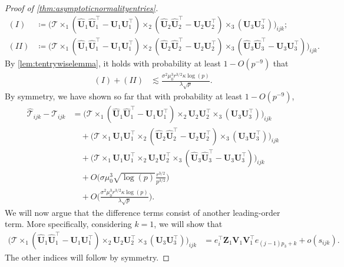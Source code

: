 \documentclass[10pt]{article}
\newcommand{\0}{{\mathbf{0}}}
\newcommand{\1}{{\mathbf{1}}}
\newcommand{\U}{{\mathbf{U}}}
\renewcommand{\t}{^{\top}}
\newcommand{\uhat}{\mathbf{\hat{U}}}
\renewcommand{\hat}{\widehat}
\renewcommand{\hat}{\widehat}
\begin{document}
\begin{proof}[Proof of \cref{thm:asymptoticnormalityentries}]
\begin{align*}
    (I) &\coloneqq  \bigg( \mathcal{T} \times_1 (\uhat_1 \uhat_1\t - \U_1\U_1\t) \times_2 ( \uhat_2 \uhat_2\t - \U_2 \U_2\t) \times_3 (\U_3 \U_3\t) \bigg)_{ijk}; \\
    (II) &\coloneqq \bigg( \mathcal{T} \times_1 (\uhat_1 \uhat_1\t - \U_1\U_1\t) \times_2 ( \uhat_2 \uhat_2\t - \U_2 \U_2\t) \times_3 (\uhat_3 \uhat_3\t - \U_3 \U_3\t) \bigg)_{ijk}.
\end{align*}
By \cref{lem:tentrywiselemma}, it holds with probability at least $1 - O(p^{-9})$ that
\begin{align*}
    (I) + (II) &\lesssim \frac{\sigma^2 \mu_0^3 r^{3/2} \kappa \log(p)}{\lambda \sqrt{p}}.
\end{align*}
By symmetry, we have shown so far that with probability at least $1 - O(p^{-9})$,
\begin{align*}
    \mathcal{\hat T}_{ijk} - \mathcal{T}_{ijk} &=  \bigg( \mathcal{T} \times_1 (\uhat_1 \uhat_1\t - \U_1\U_1\t) \times_2 \U_2 \U_2\t \times_3 ( \U_3 \U_3\t)\bigg)_{ijk} \\
    &\quad +  \bigg( \mathcal{T} \times_1  \U_1\U_1\t \times_2 (\uhat_2 \uhat_2\t - \U_2 \U_2\t) \times_3 ( \U_3 \U_3\t) \bigg)_{ijk} \\
    &\quad + \bigg( \mathcal{T} \times_1  \U_1\U_1\t \times_2 \U_2 \U_2\t \times_3 (\uhat_3\uhat_3\t  - \U_3 \U_3\t)\bigg)_{ijk} \\
    &\quad + O\bigg( \sigma \mu_0^3 \sqrt{\log(p)} \frac{r^{3/2}}{p^{3/2}} \bigg) \\
    &\quad + O\bigg( \frac{\sigma^2 \mu_0^3 r^{3/2} \kappa \log(p)}{\lambda \sqrt{p}} \bigg).
\end{align*}
We will now argue that the difference terms consist of another leading-order term.  More specifically, considering $k=1$, we will show that
\begin{align*}
    \bigg( \mathcal{T} \times_1 (\uhat_1 \uhat_1\t - \U_1\U_1\t) \times_2 \U_2 \U_2\t \times_3 ( \U_3 \U_3\t)\bigg)_{ijk} &= e_i\t \mathbf{Z}_1 \mathbf{V}_1 \mathbf{V}_1\t e_{(j-1)p_3 + k} + o( s_{ijk}).
\end{align*}
The other indices will follow by symmetry.  


\end{proof}
\end{document}

